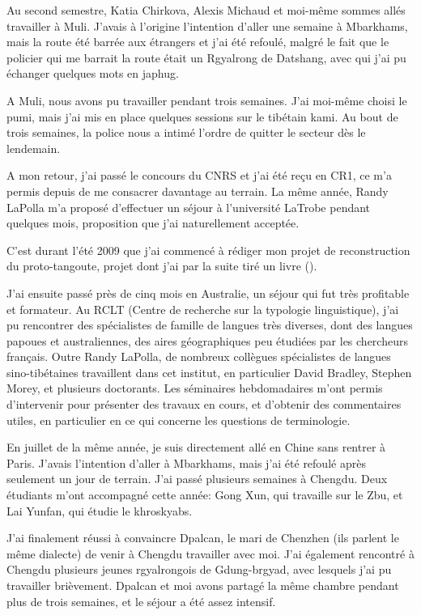\documentclass[oldfontcommands,oneside,a4paper,11pt]{memoir}
\begin{document}
Au second semestre, Katia Chirkova, Alexis Michaud et moi-même sommes allés travailler à Muli. J'avais à l'origine l'intention d'aller une semaine à Mbarkhams, mais la route été barrée aux étrangers et j'ai été refoulé, malgré le fait que le policier qui me barrait la route était un Rgyalrong de Datshang, avec qui j'ai pu échanger quelques mots en japhug.

A Muli, nous avons pu travailler pendant trois semaines. J'ai moi-même choisi le pumi, mais j'ai mis en place quelques sessions sur le tibétain kami. Au bout de trois semaines, la police nous a intimé l'ordre de quitter le secteur dès le lendemain.  

A mon retour, j'ai passé le concours du CNRS et j'ai été reçu en CR1, ce m'a permis depuis de me consacrer davantage au terrain. La même année, Randy LaPolla m'a proposé d'effectuer un séjour à l'université LaTrobe pendant quelques mois, proposition que j'ai naturellement acceptée.

C'est durant l'été 2009 que j'ai commencé à rédiger mon projet de reconstruction du proto-tangoute, projet dont j'ai par la suite tiré un livre (\citealt{jacques14esquisse}).

J'ai ensuite passé près de cinq mois en Australie, un séjour qui fut très profitable et formateur. Au RCLT (Centre de recherche sur la typologie linguistique), j'ai pu rencontrer des spécialistes de famille de langues très diverses, dont des langues papoues et australiennes, des aires géographiques peu étudiées par les chercheurs français. Outre Randy LaPolla, de nombreux collègues spécialistes de langues sino-tibétaines travaillent dans cet institut, en particulier David Bradley, Stephen Morey, et plusieurs doctorants. Les séminaires hebdomadaires m'ont permis d'intervenir pour présenter des travaux en cours, et d'obtenir des commentaires utiles, en particulier en ce qui concerne les questions de terminologie.

En juillet de la même année, je suis directement allé en Chine sans rentrer à Paris. J'avais l'intention d'aller à Mbarkhams, mais   j'ai été refoulé après seulement un jour de terrain. J'ai passé plusieurs semaines  à Chengdu. Deux étudiants m'ont accompagné cette année: Gong Xun, qui travaille sur le Zbu, et Lai Yunfan, qui étudie le khroskyabs.

J'ai finalement réussi à convaincre Dpalcan, le mari de Chenzhen (ils parlent le même dialecte) de venir à Chengdu travailler avec moi. J'ai également rencontré à Chengdu plusieurs jeunes rgyalrongois de Gdung-brgyad, avec lesquels j'ai pu travailler brièvement. Dpalcan et moi avons partagé la même chambre pendant plus de trois semaines, et le séjour a été assez intensif.  
\end{document}

